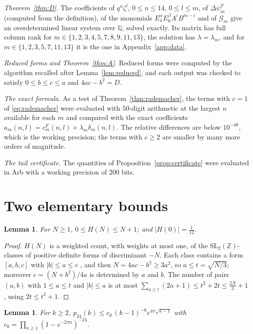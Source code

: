 \documentclass[11pt]{amsart}
\newtheorem{lemma}[theorem]{Lemma}
\theoremstyle{definition}
\newcommand{\ZZ}{\mathbb{Z}}
\newcommand{\QQ}{\mathbb{Q}}
\newcommand{\pf}{p_{24}}
\newcommand{\cF}{c^{F}}
\begin{document}
\emph{Theorem~\ref{thm:D}.} The coefficients of $q^n\zeta^l$, $0\le n\le14$, $0\le l\le m$, of $\Delta\psi^F_m$ (computed from the definition), of the monomials $E_4^\alpha E_6^\beta A^iB^{m-i}$ and of $\mathcal G_m$ give an overdetermined linear system over $\QQ$, solved exactly. Its matrix has full column rank for $m\in\{1,2,3,4,5,7,8,9,11,13\}$, the solution has $\lambda=\lambda_m$, and for $m\in\{1,2,3,5,7,11,13\}$ it is the one in Appendix~\ref{app:data}.

\emph{Reduced forms and Theorem~\ref{thm:A}.} Reduced forms were computed by the algorithm recalled after Lemma~\ref{lem:reduced}, and each output was checked to satisfy $0\le b\le c\le a$ and $4ac-b^2=D$.

\emph{The exact formula.} As a test of Theorem~\ref{thm:rademacher}, the terms with $c=1$ of \eqref{eq:rademacher} were evaluated with $50$-digit arithmetic at the largest $n$ available for each $m$ and compared with the exact coefficients $a_m(n,l)=\cF_m(n,l)+\lambda_m\delta_m(n,l)$. The relative differences are below $10^{-48}$, which is the working precision; the terms with $c\ge2$ are smaller by many more orders of magnitude.

\emph{The tail certificate.} The quantities of Proposition~\ref{prop:certificate} were evaluated in Arb with a working precision of $200$ bits.

\section{Two elementary bounds}\label{app:bounds}

\begin{lemma}\label{lem:hurwitz}
For $N\ge1$, $0\le H(N)\le N+1$; and $|H(0)|=\frac1{12}$.
\end{lemma}

\begin{proof}
$H(N)$ is a weighted count, with weights at most one, of the $\mathrm{SL}_2(\ZZ)$-classes of positive definite forms of discriminant $-N$. Each class contains a form $[a,b,c]$ with $|b|\le a\le c$ \cite[\S2.2]{Bue89}, and then $N=4ac-b^2\ge3a^2$, so $a\le t=\sqrt{N/3}$; moreover $c=(N+b^2)/4a$ is determined by $a$ and $b$. The number of pairs $(a,b)$ with $1\le a\le t$ and $|b|\le a$ is at most $\sum_{a\le t}(2a+1)\le t^2+2t\le\frac{2N}3+1$, using $2t\le t^2+1$.
\end{proof}

\begin{lemma}\label{lem:partitions}
For $k\ge2$, $\pf(k)\le c_0\,(k-1)^{-6}e^{4\pi\sqrt{k-1}}$ with $c_0=\prod_{n\ge1}(1-e^{-2\pi n})^{-24}$.
\end{lemma}
\end{document}
